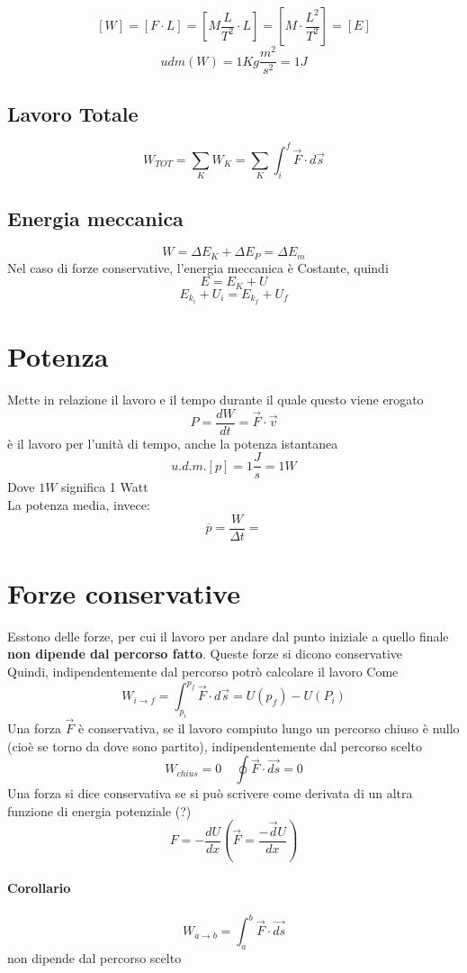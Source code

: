\documentclass[a4paper]{report}
\begin{document}
  $$ [W] = [F \cdot L] = [M \frac{L}{T^2} \cdot L] = [M \cdot \frac{L^2}{T^2}] = [E] $$
  $$ udm(W) = 1 Kg \frac{m^2}{s^2} = 1J$$
  \subsection{Lavoro Totale}
  $$ W_{TOT} = \sum_K W_K = \sum_K \int_i^f \vec{F}\cdot d\vec{s} $$
  \subsection{Energia meccanica}
  $$ W = \Delta E_K + \Delta E_P = \Delta E_m $$
  Nel caso di forze conservative, l'energia meccanica è Costante, quindi
  $$ E = E_K + U $$
  $$ E_{k_i} + U_i = E_{k_f} + U_f$$

  \section{Potenza}
  Mette in relazione il lavoro e il tempo durante il quale questo viene erogato
  $$ P = \frac{dW}{dt} = \vec{F} \cdot \vec{v} $$
  è il lavoro per l'unità di tempo, anche la potenza istantanea
  $$ u.d.m.[p] = 1 \frac{J}{s} = 1W $$
  Dove $1W$ significa 1 Watt\\
  La potenza media, invece:
  $$ \overline{p} = \frac{W}{\Delta t} =  $$


  \section{Forze conservative}
  Esstono delle forze, per cui il lavoro per andare dal punto iniziale a quello finale \textbf{non dipende dal percorso fatto}. Queste forze si dicono conservative\\
  Quindi, indipendentemente dal percorso potrò calcolare il lavoro Come
  $$ W_{i \rightarrow f} = \int_{p_i}^{p_f} \vec{F} \cdot d\vec{s} = U(p_f) - U(P_i)$$
  Una forza $\vec{F}$ è conservativa, se il lavoro compiuto lungo un percorso chiuso è nullo (cioè se torno da dove sono partito), indipendentemente dal percorso scelto
  $$ W_{chius} = 0 \quad \oint \vec{F} \cdot \vec{ds} = 0 $$
  Una forza si dice conservativa se si può scrivere come derivata di un altra funzione di energia potenziale (?)
  $$ F= -\frac{dU}{dx} (\vec{F} = \frac{-\vec{d} U}{dx})$$
  \paragraph{Corollario}
  $$ W_{a \rightarrow b} = \int_a^b \vec{F}\cdot \vec{ds} $$
  non dipende dal percorso scelto
\end{document}
